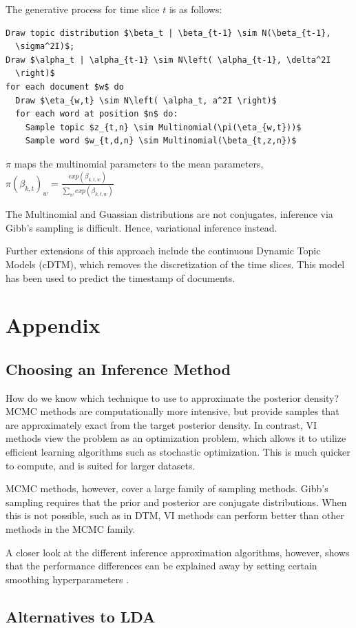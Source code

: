 \documentclass[letterpaper]{article}
\begin{document}
The generative process for time slice $t$ is as follows:

\begin{lstlisting}[mathescape=true]
Draw topic distribution $\beta_t | \beta_{t-1} \sim N(\beta_{t-1},
  \sigma^2I)$;
Draw $\alpha_t | \alpha_{t-1} \sim N\left( \alpha_{t-1}, \delta^2I
  \right)$
for each document $w$ do
  Draw $\eta_{w,t} \sim N\left( \alpha_t, a^2I \right)$
  for each word at position $n$ do:
    Sample topic $z_{t,n} \sim Multinomial(\pi(\eta_{w,t}))$
    Sample word $w_{t,d,n} \sim Multinomial(\beta_{t,z,n})$
\end{lstlisting}

$\pi$ maps the multinomial parameters to the mean parameters,
$\pi\left( \beta_{k,t} \right)_w = \frac{exp(\beta_{k,t,w})}{\sum_w exp\left( \beta_{k,t,w} \right)}$

The Multinomial and Guassian distributions are not conjugates,
inference via Gibb's sampling is difficult. Hence, variational
inference instead.

Further extensions of this approach include the continuous Dynamic
Topic Models (cDTM), which removes the discretization of the time
slices. \citep{wang-2012-contin-time} This model has been used to
predict the timestamp of documents.

\section{Appendix}
\subsection{Choosing an Inference Method}
\label{sub:choosing-inference}
How do we know which technique to use to approximate the posterior
density? MCMC methods are computationally more intensive, but provide
samples that are approximately exact from the target posterior
density. In contrast, VI methods view the problem as an optimization
problem, which allows it to utilize efficient learning algorithms such
as stochastic optimization. This is much quicker to compute, and is
suited for larger datasets.

MCMC methods, however, cover a large family of sampling methods.
Gibb's sampling requires that the prior and posterior are conjugate
distributions. When this is not possible, such as in DTM, VI methods
can perform better than other methods in the MCMC family.

A closer look at the different inference approximation algorithms,
however, shows that the performance differences can be explained away
by setting certain smoothing hyperparameters
\citep{asuncion-2012-smoot-infer}.

\subsection{Alternatives to LDA}


\end{document}
